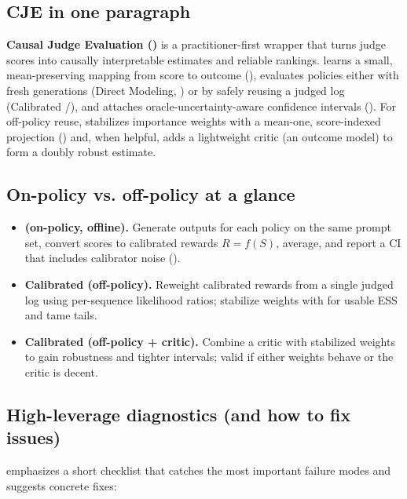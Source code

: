 \subsection{CJE in one paragraph}

\textbf{Causal Judge Evaluation (\cje)} is a practitioner-first wrapper that turns judge scores into causally interpretable estimates and reliable rankings. \cje{} learns a small, mean-preserving mapping from score to outcome (\autocal), evaluates policies either with fresh generations (Direct Modeling, \dm) or by safely reusing a judged log (Calibrated \ips/\dr), and attaches oracle-uncertainty-aware confidence intervals (\oua). For off-policy reuse, \cje{} stabilizes importance weights with a mean-one, score-indexed projection (\simcal) and, when helpful, adds a lightweight critic (an outcome model) to form a doubly robust estimate.

\subsection{On-policy vs. off-policy at a glance}

\begin{itemize}
\item \textbf{\dm{} (on-policy, offline).} Generate outputs for each policy on the same prompt set, convert scores to calibrated rewards $R = f(S)$, average, and report a CI that includes calibrator noise (\oua).

\item \textbf{Calibrated \ips{} (off-policy).} Reweight calibrated rewards from a single judged log using per-sequence likelihood ratios; stabilize weights with \simcal{} for usable ESS and tame tails.

\item \textbf{Calibrated \dr{} (off-policy + critic).} Combine a critic with stabilized weights to gain robustness and tighter intervals; valid if either weights behave or the critic is decent.
\end{itemize}

\subsection{High-leverage diagnostics (and how to fix issues)}

\cje{} emphasizes a short checklist that catches the most important failure modes and suggests concrete fixes:

